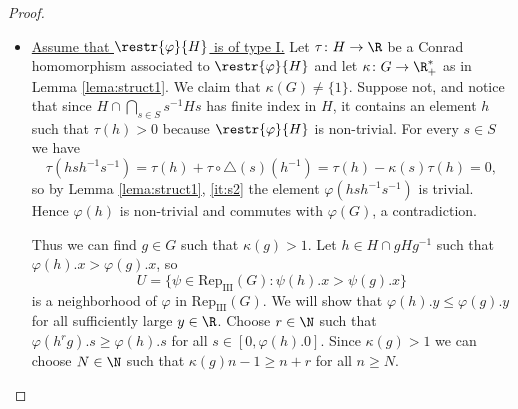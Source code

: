 \documentclass[reqno]{amsart}
\begin{document}
\begin{proof}
\begin{itemize}
	\item \underline{Assume that $\restr{\varphi}{H}$ is of type I.}  Let $\tau \colon H \to \R$ be a Conrad homomorphism associated to $\restr{\varphi}{H}$ and let $\kappa \colon G \to \R_+^\ast$ as in Lemma \ref{lema:struct1}. We claim that $\kappa(G) \neq \{1\}$. Suppose not, and notice that since $H \cap \bigcap_{s \in S}s^{-1}Hs$ has finite index in $H$, it contains an element $h$ such that $\tau(h) > 0$ because $\restr{\varphi}{H}$ is non-trivial. For every $s \in S$ we have
\[
        \tau(hsh^{-1}s^{-1}) = \tau(h) + \tau \circ \triangle(s)(h^{-1}) = \tau(h) - \kappa(s) \tau(h) = 0,
\]
so by Lemma \ref{lema:struct1}, \eqref{it:s2} the element $\varphi(hsh^{-1}s^{-1})$ is trivial. Hence $\varphi(h)$ is non-trivial and commutes with $\varphi(G)$, a contradiction.

Thus we can find $g \in G$ such that $\kappa(g) > 1$. Let $h \in H \cap g H g^{-1}$ such that $\varphi(h).x > \varphi(g).x$, so
\[
	U = \{\psi \in \mathrm{Rep}_\mathrm{III}(G) : \psi(h).x > \psi(g).x\}
\]
is a neighborhood of $\varphi$ in $\mathrm{Rep}_\mathrm{III}(G)$. We will show that $\varphi(h).y \leq \varphi(g).y$ for all sufficiently large $y \in \R$. Choose $r \in \N$ such that $\varphi(h^r g).s \geq \varphi(h).s$ for all $s \in [0, \varphi(h).0]$. Since $\kappa(g) > 1$ we can choose $N \in \N$ such that $\kappa(g)n - 1 \geq n + r$ for all $n \geq N$.


\end{itemize}
\end{proof}
\end{document}
